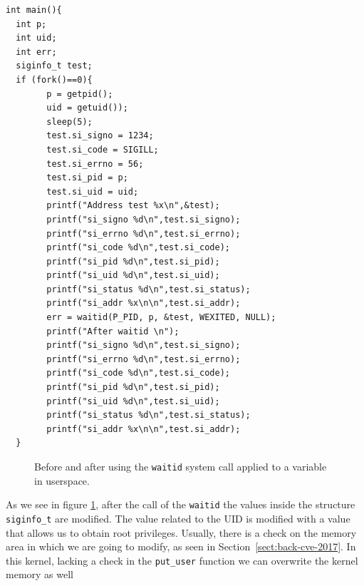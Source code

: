 \documentclass{masterthesis}
\newcommand{\refToSection}[1]{Section~\ref{sect:#1}\xspace}
\begin{document}
\begin{lstlisting}
int main(){
  int p;
  int uid;
  int err;
  siginfo_t test;
  if (fork()==0){
        p = getpid();
        uid = getuid());
        sleep(5);
        test.si_signo = 1234;
        test.si_code = SIGILL;
        test.si_errno = 56;
        test.si_pid = p;
        test.si_uid = uid;
        printf("Address test %x\n",&test);
        printf("si_signo %d\n",test.si_signo);
        printf("si_errno %d\n",test.si_errno);
        printf("si_code %d\n",test.si_code);
        printf("si_pid %d\n",test.si_pid);
        printf("si_uid %d\n",test.si_uid);
        printf("si_status %d\n",test.si_status);
        printf("si_addr %x\n\n",test.si_addr);
        err = waitid(P_PID, p, &test, WEXITED, NULL);
        printf("After waitid \n");
        printf("si_signo %d\n",test.si_signo);
        printf("si_errno %d\n",test.si_errno);
        printf("si_code %d\n",test.si_code);
        printf("si_pid %d\n",test.si_pid);
        printf("si_uid %d\n",test.si_uid);
        printf("si_status %d\n",test.si_status);
        printf("si_addr %x\n\n",test.si_addr);
  }
\end{lstlisting}
\begin{figure}[h!]
   \caption{Before and after using the \texttt{waitid} system call applied to a variable in userspace.}\label{figure:waitid_show}
\end{figure} 
As we see in figure \ref{figure:waitid_show}, after the call of the \texttt{waitid} the values inside the structure \texttt{siginfo\_t} are modified. The value related to the UID is modified with a value that allows us to obtain root privileges. Usually, there is a check on the memory area in which we are going to modify, as seen in \refToSection{back-cve-2017}. In this kernel, lacking a check in the \texttt{put_user} function we can overwrite the kernel memory as well
\end{document}
